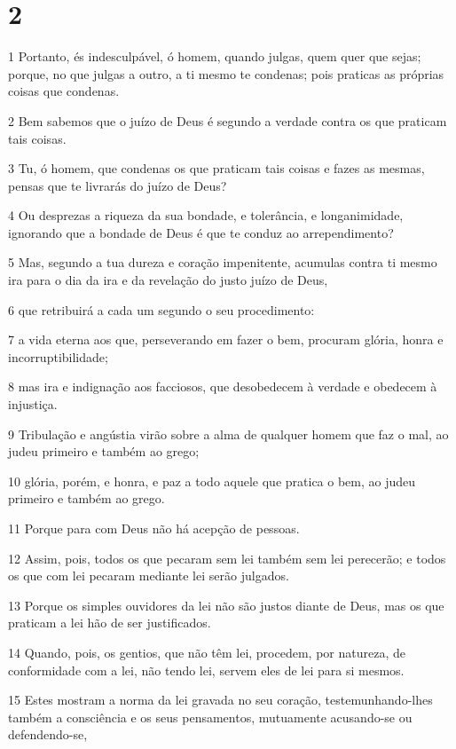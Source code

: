 \chapter{2}

\par 1 Portanto, és indesculpável, ó homem, quando julgas, quem quer que sejas; porque, no que julgas a outro, a ti mesmo te condenas; pois praticas as próprias coisas que condenas.
\par 2 Bem sabemos que o juízo de Deus é segundo a verdade contra os que praticam tais coisas.
\par 3 Tu, ó homem, que condenas os que praticam tais coisas e fazes as mesmas, pensas que te livrarás do juízo de Deus?
\par 4 Ou desprezas a riqueza da sua bondade, e tolerância, e longanimidade, ignorando que a bondade de Deus é que te conduz ao arrependimento?
\par 5 Mas, segundo a tua dureza e coração impenitente, acumulas contra ti mesmo ira para o dia da ira e da revelação do justo juízo de Deus,
\par 6 que retribuirá a cada um segundo o seu procedimento:
\par 7 a vida eterna aos que, perseverando em fazer o bem, procuram glória, honra e incorruptibilidade;
\par 8 mas ira e indignação aos facciosos, que desobedecem à verdade e obedecem à injustiça.
\par 9 Tribulação e angústia virão sobre a alma de qualquer homem que faz o mal, ao judeu primeiro e também ao grego;
\par 10 glória, porém, e honra, e paz a todo aquele que pratica o bem, ao judeu primeiro e também ao grego.
\par 11 Porque para com Deus não há acepção de pessoas.
\par 12 Assim, pois, todos os que pecaram sem lei também sem lei perecerão; e todos os que com lei pecaram mediante lei serão julgados.
\par 13 Porque os simples ouvidores da lei não são justos diante de Deus, mas os que praticam a lei hão de ser justificados.
\par 14 Quando, pois, os gentios, que não têm lei, procedem, por natureza, de conformidade com a lei, não tendo lei, servem eles de lei para si mesmos.
\par 15 Estes mostram a norma da lei gravada no seu coração, testemunhando-lhes também a consciência e os seus pensamentos, mutuamente acusando-se ou defendendo-se,
